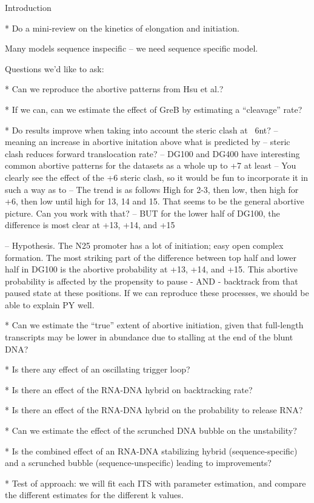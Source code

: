 Introduction

* Do a mini-review on the kinetics of elongation and initiation.

Many models sequence inspecific -- we need sequence specific model.

Questions we'd like to ask:

* Can we reproduce the abortive patterns from Hsu et al.?

* If we can, can we estimate the effect of GreB by estimating a ``cleavage'' rate?

* Do results improve when taking into account the steric clash at ~6nt?
    -- meaning an increase in abortive initation above what is predicted by
    -- steric clash reduces forward translocation rate?
    -- DG100 and DG400 have interesting common abortive patterns for the
    datasets as a whole up to +7 at least
    -- You clearly see the effect of the +6 steric clash, so it would be fun
       to incorporate it in such a way as to 
    -- The trend is as follows High for 2-3, then low, then high for +6, then
    low until high for 13, 14 and 15. That seems to be the general abortive
    picture. Can you work with that?
    -- BUT for the lower half of DG100, the difference is most clear at +13,
    +14, and +15

    -- Hypothesis. The N25 promoter has a lot of initiation; easy open complex
    formation. The most striking part of the difference between top half and
    lower half in DG100 is the abortive probability at +13, +14, and +15. This
    abortive probability is affected by the propensity to pause - AND -
    backtrack from that paused state at these positions. If we can reproduce
    these processes, we should be able to explain PY well.

* Can we estimate the ``true'' extent of abortive initiation, given that
  full-length transcripts may be lower in abundance due to stalling at the end of
  the blunt DNA?

* Is there any effect of an oscillating trigger loop?

* Is there an effect of the RNA-DNA hybrid on backtracking rate?

* Is there an effect of the RNA-DNA hybrid on the probability to release RNA?

* Can we estimate the effect of the scrunched DNA bubble on the unstability?

* Is the combined effect of an RNA-DNA stabilizing hybrid (sequence-specific)
  and a scrunched bubble (sequence-unspecific) leading to improvements?

* Test of approach: we will fit each ITS with parameter estimation, and compare
  the different estimates for the different k values.
